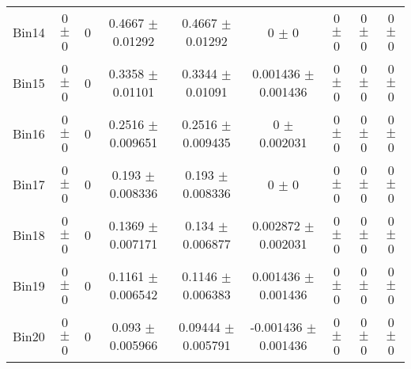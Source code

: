 \begin{tabular}{@{\extracolsep{4pt}}lcccccccc@{}}
     Bin14 & 0 $\pm$ 0 & 0 & 0.4667 $\pm$ 0.01292 & 0.4667 $\pm$ 0.01292 & 0 $\pm$ 0 & 0 $\pm$ 0 & 0 $\pm$ 0 & 0 $\pm$ 0 \\ 
     Bin15 & 0 $\pm$ 0 & 0 & 0.3358 $\pm$ 0.01101 & 0.3344 $\pm$ 0.01091 & 0.001436 $\pm$ 0.001436 & 0 $\pm$ 0 & 0 $\pm$ 0 & 0 $\pm$ 0 \\ 
     Bin16 & 0 $\pm$ 0 & 0 & 0.2516 $\pm$ 0.009651 & 0.2516 $\pm$ 0.009435 & 0 $\pm$ 0.002031 & 0 $\pm$ 0 & 0 $\pm$ 0 & 0 $\pm$ 0 \\ 
     Bin17 & 0 $\pm$ 0 & 0 & 0.193 $\pm$ 0.008336 & 0.193 $\pm$ 0.008336 & 0 $\pm$ 0 & 0 $\pm$ 0 & 0 $\pm$ 0 & 0 $\pm$ 0 \\ 
     Bin18 & 0 $\pm$ 0 & 0 & 0.1369 $\pm$ 0.007171 & 0.134 $\pm$ 0.006877 & 0.002872 $\pm$ 0.002031 & 0 $\pm$ 0 & 0 $\pm$ 0 & 0 $\pm$ 0 \\ 
     Bin19 & 0 $\pm$ 0 & 0 & 0.1161 $\pm$ 0.006542 & 0.1146 $\pm$ 0.006383 & 0.001436 $\pm$ 0.001436 & 0 $\pm$ 0 & 0 $\pm$ 0 & 0 $\pm$ 0 \\ 
     Bin20 & 0 $\pm$ 0 & 0 & 0.093 $\pm$ 0.005966 & 0.09444 $\pm$ 0.005791 & -0.001436 $\pm$ 0.001436 & 0 $\pm$ 0 & 0 $\pm$ 0 & 0 $\pm$ 0 \\ 
\hline\hline
  \end{tabular}
